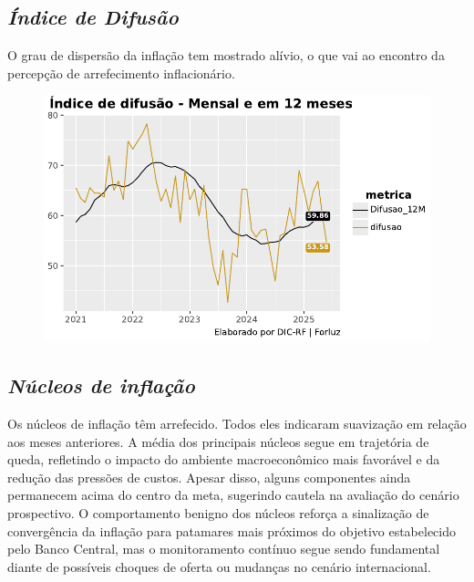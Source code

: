\documentclass[
  letterpaper,
  DIV=11,
  numbers=noendperiod]{scrartcl}
\begin{document}
\hypertarget{uxedndice-de-difusuxe3o}{%
\subsection{\texorpdfstring{\emph{Índice de
Difusão}}{Índice de Difusão}}\label{uxedndice-de-difusuxe3o}}

O grau de dispersão da inflação tem mostrado alívio, o que vai ao
encontro da percepção de arrefecimento inflacionário.

\begin{figure}

{\centering \includegraphics{Projeto IPCA Conjuntura_files/figure-pdf/cell-9-output-1.pdf}

}

\end{figure}

\hypertarget{nuxfacleos-de-inflauxe7uxe3o}{%
\subsection{\texorpdfstring{\emph{Núcleos de
inflação}}{Núcleos de inflação}}\label{nuxfacleos-de-inflauxe7uxe3o}}

Os núcleos de inflação têm arrefecido. Todos eles indicaram suavização
em relação aos meses anteriores. A média dos principais núcleos segue em
trajetória de queda, refletindo o impacto do ambiente macroeconômico
mais favorável e da redução das pressões de custos. Apesar disso, alguns
componentes ainda permanecem acima do centro da meta, sugerindo cautela
na avaliação do cenário prospectivo. O comportamento benigno dos núcleos
reforça a sinalização de convergência da inflação para patamares mais
próximos do objetivo estabelecido pelo Banco Central, mas o
monitoramento contínuo segue sendo fundamental diante de possíveis
choques de oferta ou mudanças no cenário internacional.
\end{document}
